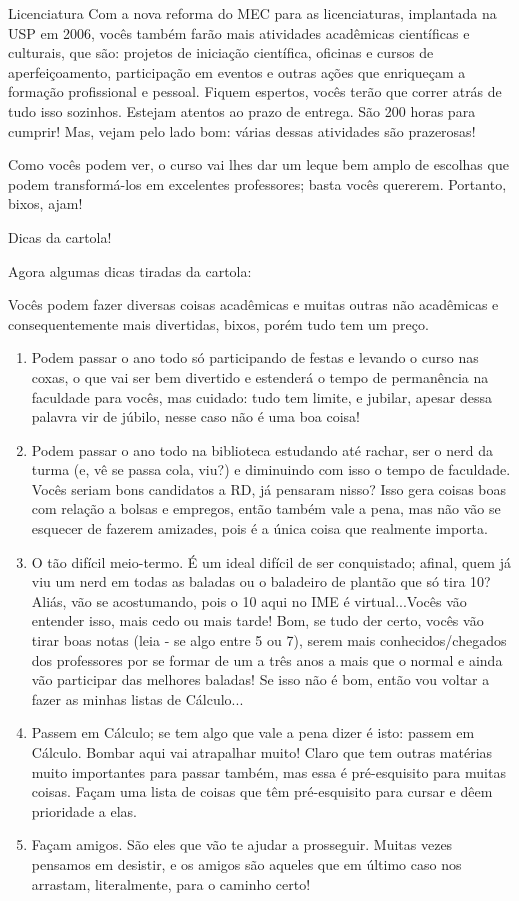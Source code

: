 \begin{subsecao}{Licenciatura}
Com a nova reforma do MEC para as licenciaturas, implantada na USP em 2006,
vocês também farão mais atividades acadêmicas científicas e culturais, que são:
projetos de iniciação científica, oficinas e cursos de aperfeiçoamento,
participação em eventos e outras ações que enriqueçam a formação profissional e
pessoal. Fiquem espertos, vocês terão que correr atrás de tudo isso sozinhos.
Estejam atentos ao prazo de entrega. São 200 horas para cumprir! Mas, vejam pelo
lado bom: várias dessas atividades são prazerosas!

Como vocês podem ver, o curso vai lhes dar um leque bem amplo de escolhas que
podem transformá-los em excelentes professores; basta vocês quererem. Portanto,
bixos, ajam!

\begin{subsubsecao}{Dicas da cartola!}

Agora algumas dicas tiradas da cartola:

Vocês podem fazer diversas coisas acadêmicas e muitas outras não acadêmicas e
consequentemente mais divertidas, bixos, porém tudo tem um preço.

\begin{enumerate}
\item Podem passar o ano todo só participando de festas e levando o curso nas
  coxas, o que vai ser bem divertido e estenderá o tempo de permanência na
  faculdade para vocês, mas cuidado: tudo tem limite, e jubilar, apesar dessa
  palavra vir de júbilo, nesse caso não é uma boa coisa!
\item Podem passar o ano todo na biblioteca estudando até rachar, ser o nerd da
  turma (e, vê se passa cola, viu?) e diminuindo com isso o tempo de faculdade.
  Vocês seriam bons candidatos a RD, já pensaram nisso? Isso gera coisas boas
  com relação a bolsas e empregos, então também vale a pena, mas não vão se
  esquecer de fazerem amizades, pois é a única coisa que realmente importa.
\item O tão difícil meio-termo. É um ideal difícil de ser conquistado; afinal,
  quem já viu um nerd em todas as baladas ou o baladeiro de plantão que só tira
  10? Aliás, vão se acostumando, pois o 10 aqui no IME é virtual...Vocês vão
  entender isso, mais cedo ou mais tarde! Bom, se tudo der certo, vocês vão
  tirar boas notas (leia - se algo entre 5 ou 7), serem mais conhecidos/chegados
  dos professores por se formar de um a três anos a mais que o normal e ainda
  vão participar das melhores baladas! Se isso não é bom, então vou voltar a
  fazer as minhas listas de Cálculo...
\item Passem em Cálculo; se tem algo que vale a pena dizer é isto: passem em
  Cálculo. Bombar aqui vai atrapalhar muito! Claro que tem outras matérias muito
  importantes para passar também, mas essa é pré-esquisito para muitas coisas.
  Façam uma lista de coisas que têm pré-esquisito para cursar e dêem prioridade
  a elas.
\item Façam amigos. São eles que vão te ajudar a prosseguir. Muitas vezes
  pensamos em desistir, e os amigos são aqueles que em último caso nos arrastam,
  literalmente, para o caminho certo!


\end{enumerate}
\end{subsubsecao}
\end{subsecao}
